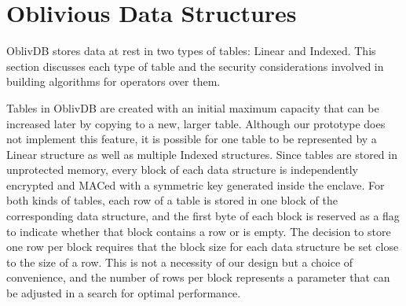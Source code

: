 \documentclass[letterpaper,twocolumn,10pt]{article}
\newcommand{\ignore}[1]{}
\def\name/{OblivDB}
\begin{document}
\ignore{
\subsection{B+ Tree}

The B+ tree is a generalization of the well-known binary search tree and is a data structure frequently used for database indexes~\cite{EN10, BPlus}. All data is kept in the leaves of the tree, and each row in the database is associated with a \textit{key}. Each internal node contains a series of ordered \textit{labels} corresponding to potential values of keys in the table, with the number of children varying between fixed minimum and maximum values. There is one child node between every pair of labels that represents any rows whose key falls between those label values. The algorithm to find a row with a specific key follows the path down the tree to the desired leaf, much like a binary search tree. Each leaf is connnected to the next with a pointer so that it is possible to follow the data sequentially as a linked list once a desired row is found. 

Although the process of looking up data in a B+ tree is fairly straightforward, there are a long list of rules involved in maintaining the invariants mentioned above while inserting or deleting rows. As these details are not immediately relevant to the work presented here, we refer the interested reader to standard database texts (e.g.~\cite{EN10}) for details. 
}

\section{Oblivious Data Structures}\label{oblivData}
\name/ stores data at rest in two types of tables: Linear and Indexed. This section discusses each type of table and the security considerations involved in building algorithms for operators over them. 

Tables in \name/ are created with an initial maximum capacity that can be increased later by copying to a new, larger table. Although our prototype does not implement this feature, it is possible for one table to be represented by a Linear structure as well as multiple Indexed structures. Since tables are stored in unprotected memory, every block of each data structure is independently encrypted and MACed with a symmetric key generated inside the enclave. For both kinds of tables, each row of a table is stored in one block of the corresponding data structure, and the first byte of each block is reserved as a flag to indicate whether that block contains a row or is empty. The decision to store one row per block requires that the block size for each data structure be set close to the size of a row. This is not a necessity of our design but a choice of convenience, and the number of rows per block represents a parameter that can be adjusted in a search for optimal performance.
\end{document}
